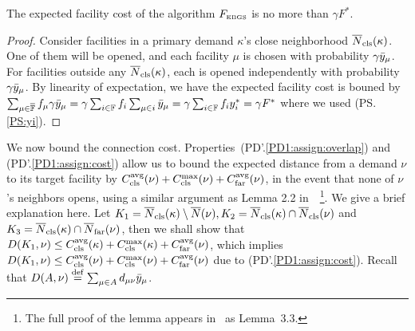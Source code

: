 \begin{lemma} \label{lem: EBGS facility cost}
  The expected facility cost of the algorithm $F_{\mbox{\tiny\rm EBGS}}$ is no more
  than $\gamma F^\ast$.
\end{lemma}
\begin{proof}
  Consider facilities in a primary demand $\kappa$'s close
  neighborhood ${\overline{N}}_{\text{cls}}(\kappa)$. One of them will be opened, and
  each facility $\mu$ is chosen with probability $\gamma
  {\bar y}_{\mu}$. For facilities outside any ${\overline{N}}_{\text{cls}}(\kappa)$, each
  is opened independently with probability $\gamma {\bar y}_{\mu}$. By
  linearity of expectation, we have the expected facility cost is
  bouned by $\sum_{\mu \in \overline{\mathbb{F}}} f_\mu \gamma {\bar y}_{\mu} =
  \gamma \sum_{i\in \mathbb{F}} f_i \sum_{\mu\in i} {\bar y}_{\mu} =
  \gamma \sum_{i \in \mathbb{F}} f_i y_i^\ast = \gamma F^\ast$ where we
  used (PS.\ref{PS:yi}).

\end{proof}

We now bound the connection
cost. Properties~(PD'.\ref{PD1:assign:overlap}) and
(PD'.\ref{PD1:assign:cost}) allow us to bound the expected distance
from a demand $\nu$ to its target facility by
$C_{\text{cls}}^{{\mbox{\scriptsize\rm avg}}}(\nu)+C_{\text{cls}}^{\max}(\nu)+C_{\text{far}}^{{\mbox{\scriptsize\rm avg}}}(\nu)$, in the event that none of
$\nu$'s neighbors opens, using a similar argument as Lemma 2.2
in~\cite{ByrkaGS10}~\footnote{The full proof of the lemma appears
  in~\cite{ByrkaA10} as Lemma~3.3.}. We give a brief explanation
here. Let $K_1 = {\overline{N}}_{\text{cls}}(\kappa) \setminus {\overline{N}}(\nu), K_2 =
{\overline{N}}_{\text{cls}}(\kappa) \cap {\overline{N}}_{\text{cls}}(\nu)$ and $K_3 = {\overline{N}}_{\text{cls}}(\kappa)
\cap {\overline{N}}_{\text{far}}(\nu)$, then we shall show that $D(K_1, \nu) \leq
C_{\text{cls}}^{{\mbox{\scriptsize\rm avg}}}(\kappa)+C_{\text{cls}}^{\max}(\kappa)+C_{\text{far}}^{{\mbox{\scriptsize\rm avg}}}(\nu)$, which implies $D(K_1,
\nu) \leq C_{\text{cls}}^{{\mbox{\scriptsize\rm avg}}}(\nu)+C_{\text{cls}}^{\max}(\nu)+C_{\text{far}}^{{\mbox{\scriptsize\rm avg}}}(\nu)$ due to
(PD'.\ref{PD1:assign:cost}). Recall that $D(A,\nu)
\stackrel{\mathrm{def}}{=} \sum_{\mu\in A} d_{\mu\nu}{\bar y}_{\mu}$. 

